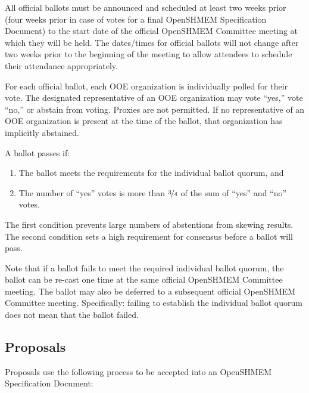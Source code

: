 All official ballots must be announced and scheduled at least two
weeks prior (four weeks prior in case of votes for a final OpenSHMEM Specification
Document) to the start date of the official OpenSHMEM Committee meeting at
which they will be held.  The dates/times for official ballots will
not change after two weeks prior to the beginning of the meeting to
allow attendees to schedule their attendance appropriately.

For each official ballot, each OOE organization is individually
polled for their vote.  The designated representative of an OOE
organization may vote ``yes,'' vote ``no,'' or abstain from voting.
Proxies are not permitted.  If no representative of an OOE
organization is present at the time of the ballot, that
organization has implicitly abstained.

A ballot passes if:

\begin{enumerate}
\item The ballot meets the requirements for the individual ballot
  quorum, and
\item The number of ``yes'' votes is more than $\nicefrac{3}{4}$ of
  the sum of ``yes'' and ``no'' votes.
\end{enumerate}

\begin{rationale}
  The first condition prevents large numbers of abstentions from
  skewing results.  The second condition sets a high requirement for
  consensus before a ballot will pass.
\end{rationale}

Note that if a ballot fails to meet the required individual ballot
quorum, the ballot can be re-cast one time at the same official OpenSHMEM
Committee meeting.  The ballot may also be deferred to a subsequent
official OpenSHMEM Committee meeting.  Specifically: failing to establish the
individual ballot quorum does not mean that the ballot failed.


\subsection{Proposals}
\label{subsec:general-text-proposals}

Proposals use the following process to be accepted into
an OpenSHMEM Specification Document:

